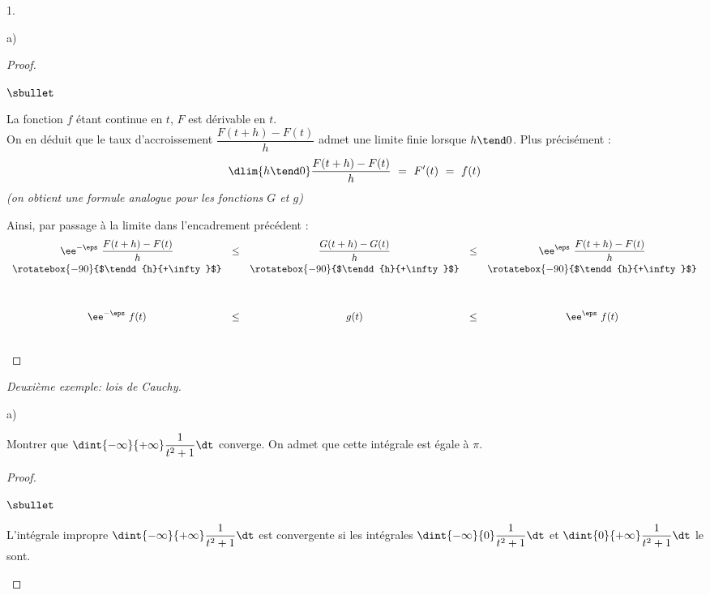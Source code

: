 \begin{noliste}{1.}
\begin{noliste}{a)}
\begin{proof}
\begin{noliste}{$\sbullet$}
      \item La fonction $f$ étant continue en $t$, $F$ est
        dérivable en $t$.\\[.1cm]
        On en déduit que le taux d'accroissement $\dfrac{F(t+h) -
          F(t)}{h}$ admet une limite finie lorsque $h \tend 0$. Plus
        précisément :
        \[
        \dlim{h \tend 0} \dfrac{F(t+h) - F(t)}{h} \ = \ F'(t) \ = \
        f(t)
        \]
        {\it (on obtient une formule analogue pour les fonctions $G$
          et $g$)}
          
          
          \newpage
          
          
        Ainsi, par passage à la limite dans l'encadrement précédent :
        \[
        \begin{array}{ccccc}
          \ee^{-\eps} \ \dfrac{F(t+h) - F(t)}{h} & \leq & \dfrac{G(t+h)
            - G(t)}{h} & \leq & \ee^{\eps} \ \dfrac{F(t+h) - F(t)}{h}
          \\[.2cm]
          \rotatebox{-90}{$\tendd{h}{+\infty}$} & &
          \rotatebox{-90}{$\tendd{h}{+\infty}$} & &
          \rotatebox{-90}{$\tendd{h}{+\infty}$} 
          \\[1.2cm]
          \ee^{-\eps} \ f(t) & \leq & g(t) & \leq & \ee^{\eps} \ f(t)
        \end{array}
        \]        
      \end{noliste}
      ~\\[-1.2cm]
    \end{proof}

  \end{noliste}
  
\item {\em Deuxième exemple: lois de Cauchy.}
  \begin{noliste}{a)}
    \setlength{\itemsep}{2mm} %
  \item Montrer que $\dint{-\infty}{+\infty} \dfrac{1}{t^2+1} \dt$
    converge. On admet que cette intégrale est égale à $\pi$.

    \begin{proof}~%
      \begin{noliste}{$\sbullet$}
      \item L'intégrale impropre $\dint{-\infty}{+\infty}
        \dfrac{1}{t^2+1} \dt$ est convergente si les intégrales
        $\dint{-\infty}{0} \dfrac{1}{t^2+1} \dt$ et $\dint{0}{+\infty}
        \dfrac{1}{t^2+1} \dt$ le sont.


\end{noliste}
\end{proof}
\end{noliste}
\end{noliste}

